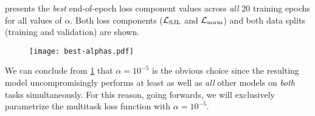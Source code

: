  presents the \emph{best} end-of-epoch loss component values across \textit{all} 20 training epochs for all values of $\alpha$.
Both loss components ($\mathcal{L}_{\mathrm{SJL}}$ and $\mathcal{L}_{\mathrm{norm}}$) and both data splits (training and validation) are shown.
\begin{figure}[H]
  \centering
  \texttt{[image: best-alphas.pdf]}
  \label{fig:best-epoch}
\end{figure}
\noindent
We can conclude from \cref{fig:best-epoch} that $\alpha = 10^{-5}$ is the obvious choice since the resulting model uncompromisingly performs at least as well as \emph{all} other models on \emph{both} tasks simultaneously.
For this reason, going forwards, we will exclusively parametrize the multitask loss function with $\alpha = 10^{-5}$.

